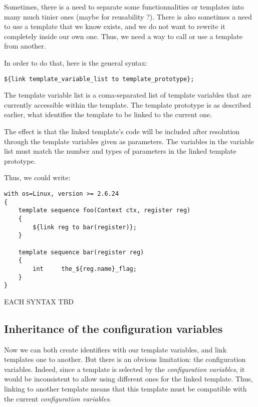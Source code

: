 \documentclass[american]{rtxreport}
\begin{document}
Sometimes, there is a need to separate some functionnalities or templates into
many much tinier ones (maybe for reusability ?). There is also sometimes a need
to use a template that we know exists, and we do not want to rewrite it
completely inside our own one. Thus, we need a way to call or use a template
from another.

In order to do that, here is the general syntax:
\begin{lstlisting}
${link template_variable_list to template_prototype};
\end{lstlisting}

The template variable list is a coma-separated list of template variables that
are currently accessible within the template. The template prototype is as
described earlier, what identifies the template to be linked to the current
one.

The effect is that the linked template's code will be included after resolution
through the template variables given as parameters. The variables in the
variable list must match the number and types of parameters in the linked
template prototype.

Thus, we could write: 
\begin{lstlisting}
with os=Linux, version >= 2.6.24
{
    template sequence foo(Context ctx, register reg)
    {
        ${link reg to bar(register)};
    }

    template sequence bar(register reg)
    {
        int     the_${reg.name}_flag;
    }
}
\end{lstlisting}


EACH SYNTAX TBD



\subsection{Inheritance of the configuration variables}

Now we can both create identifiers with our template variables, and link
templates one to another. But there is an obvious limitation: the configuration
variables. Indeed, since a template is selected by the \emph{configuration
variables}, it would be inconsistent to allow using different ones for the
linked template. Thus, linking to another template means that this template
must be compatible with the current \emph{configuration variables}.
\end{document}
